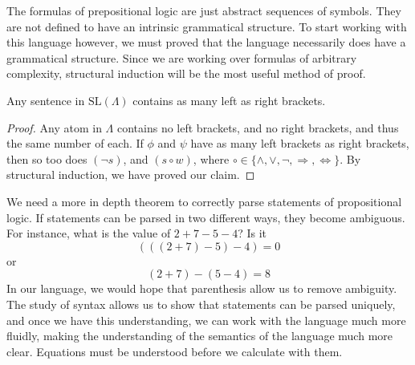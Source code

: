 The formulas of prepositional logic are just abstract sequences of symbols. They are not defined to have an intrinsic grammatical structure. To start working with this language however, we must proved that the language necessarily does have a grammatical structure. Since we are working over formulas of arbitrary complexity, structural induction will be the most useful method of proof.

\begin{theorem}
    Any sentence in $\text{SL}(\Lambda)$ contains as many left as right brackets.
\end{theorem}
\begin{proof}
    Any atom in $\Lambda$ contains no left brackets, and no right brackets, and thus the same number of each. If $\phi$ and $\psi$ have as many left brackets as right brackets, then so too does $(\neg s)$, and $(s \circ w)$, where $\circ \in \{ \wedge, \vee, \neg, \Rightarrow, \Leftrightarrow \}$. By structural induction, we have proved our claim.
\end{proof}

We need a more in depth theorem to correctly parse statements of propositional logic. If statements can be parsed in two different ways, they become ambiguous. For instance, what is the value of $2 + 7 - 5 - 4$? Is it
%
\[ (((2 + 7) - 5) - 4) = 0 \]
%
or
%
\[ (2 + 7) - (5 - 4) = 8 \]
%
In our language, we would hope that parenthesis allow us to remove ambiguity. The study of syntax allows us to show that statements can be parsed uniquely, and once we have this understanding, we can work with the language much more fluidly, making the understanding of the semantics of the language much more clear. Equations must be understood before we calculate with them.


